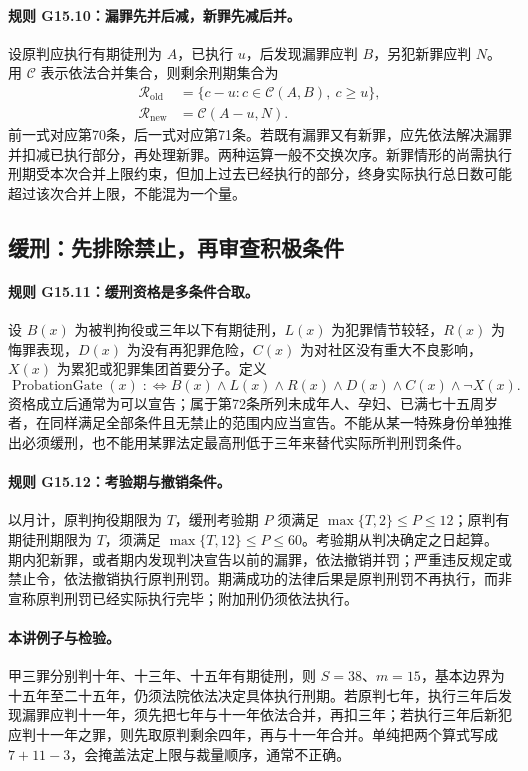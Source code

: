 \paragraph{规则 G15.10：漏罪先并后减，新罪先减后并。}
设原判应执行有期徒刑为 $A$，已执行 $u$，后发现漏罪应判 $B$，另犯新罪应判 $N$。用 $\mathcal{C}$ 表示依法合并集合，则剩余刑期集合为
\[
\begin{aligned}
\mathcal{R}_{\mathrm{old}}&=\{c-u:c\in\mathcal{C}(A,B),\ c\ge u\},\\
\mathcal{R}_{\mathrm{new}}&=\mathcal{C}(A-u,N).
\end{aligned}
\]
前一式对应第70条，后一式对应第71条。若既有漏罪又有新罪，应先依法解决漏罪并扣减已执行部分，再处理新罪。两种运算一般不交换次序。新罪情形的尚需执行刑期受本次合并上限约束，但加上过去已经执行的部分，终身实际执行总日数可能超过该次合并上限，不能混为一个量。

\subsection{缓刑：先排除禁止，再审查积极条件}
\paragraph{规则 G15.11：缓刑资格是多条件合取。}
设 $B(x)$ 为被判拘役或三年以下有期徒刑，$L(x)$ 为犯罪情节较轻，$R(x)$ 为悔罪表现，$D(x)$ 为没有再犯罪危险，$C(x)$ 为对社区没有重大不良影响，$X(x)$ 为累犯或犯罪集团首要分子。定义
\[
\operatorname{ProbationGate}(x)\;:\!\!\iff
B(x)\land L(x)\land R(x)\land D(x)\land C(x)\land\neg X(x).
\]
资格成立后通常为可以宣告；属于第72条所列未成年人、孕妇、已满七十五周岁者，在同样满足全部条件且无禁止的范围内应当宣告。不能从某一特殊身份单独推出必须缓刑，也不能用某罪法定最高刑低于三年来替代实际所判刑罚条件。

\paragraph{规则 G15.12：考验期与撤销条件。}
以月计，原判拘役期限为 $T$，缓刑考验期 $P$ 须满足 $\max\{T,2\}\le P\le12$；原判有期徒刑期限为 $T$，须满足 $\max\{T,12\}\le P\le60$。考验期从判决确定之日起算。期内犯新罪，或者期内发现判决宣告以前的漏罪，依法撤销并罚；严重违反规定或禁止令，依法撤销执行原判刑罚。期满成功的法律后果是原判刑罚不再执行，而非宣称原判刑罚已经实际执行完毕；附加刑仍须依法执行。

\paragraph{本讲例子与检验。}
甲三罪分别判十年、十三年、十五年有期徒刑，则 $S=38$、$m=15$，基本边界为十五年至二十五年，仍须法院依法决定具体执行刑期。若原判七年，执行三年后发现漏罪应判十一年，须先把七年与十一年依法合并，再扣三年；若执行三年后新犯应判十一年之罪，则先取原判剩余四年，再与十一年合并。单纯把两个算式写成 $7+11-3$，会掩盖法定上限与裁量顺序，通常不正确。


